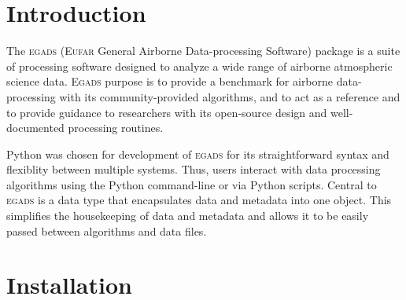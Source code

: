 \documentclass[a4paper,11pt]{report}
\newcommand{\egads}{\textsc{egads} }
\newcommand{\Egads}{\textsc{Egads} }
\begin{document}
\renewcommand{\thepage}{\roman{page}}






\tableofcontents
\pagebreak


\renewcommand{\thepage}{\arabic{page}}
\setcounter{page}{1}

\chapter{Introduction}

The \egads (\textsc{Eufar} General Airborne Data-processing Software) package is
a suite of processing software designed to analyze a wide range of airborne atmospheric science
data. \Egads purpose is to provide a benchmark for airborne data-processing with its community-provided
algorithms, and to act as a reference and to provide guidance to researchers with its open-source design
and well-documented processing routines.

Python was chosen for development of \egads for its straightforward syntax and flexiblity between multiple systems.
Thus, users interact with data processing algorithms using the Python command-line or via Python scripts. 
Central to \egads is a data type that encapsulates data and metadata into one object. 
This simplifies the housekeeping of data and metadata and allows it to be easily passed between algorithms and data files.



\chapter{Installation}
\end{document}
